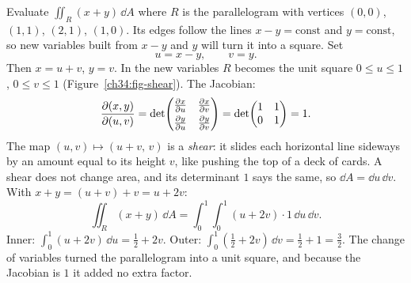 \begin{example}
\label{ch34:ex-cov}
Evaluate $\iint_R (x+y)\,\dd A$ where $R$ is the parallelogram with vertices
$(0,0)$, $(1,1)$, $(2,1)$, $(1,0)$. Its edges
follow the lines $x-y=\text{const}$ and $y=\text{const}$, so new variables built
from $x-y$ and $y$ will turn it into a square. Set
\[
  u=x-y,\qquad v=y .
\]
Then $x=u+v$, $y=v$. In the new variables $R$ becomes the unit square
$0\le u\le 1$, $0\le v\le 1$ (Figure~\ref{ch34:fig-shear}). The Jacobian:
\[
  \frac{\partial(x,y)}{\partial(u,v)}
  =\det\!\begin{pmatrix}\frac{\partial x}{\partial u}&\frac{\partial x}{\partial v}\\[3pt]\frac{\partial y}{\partial u}&\frac{\partial y}{\partial v}\end{pmatrix}
  =\det\!\begin{pmatrix}1&1\\0&1\end{pmatrix}=1 .
\]
The map $(u,v)\mapsto(u+v,\,v)$ is a \emph{shear}: it slides each horizontal
line sideways by an amount equal to its height $v$, like pushing the top of a deck
of cards. A shear does not change area, and its determinant $1$ says the same, so
$\dd A=\dd u\,\dd v$. With $x+y=(u+v)+v=u+2v$:
\[
  \iint_R(x+y)\,\dd A=\int_0^1\!\int_0^1 (u+2v)\cdot 1\,\dd u\,\dd v .
\]
Inner: $\int_0^1(u+2v)\,\dd u=\tfrac12+2v$. Outer:
$\int_0^1(\tfrac12+2v)\,\dd v=\tfrac12+1=\tfrac32$. The change of variables turned
the parallelogram into a unit square, and because the Jacobian is $1$ it added no
extra factor.
\end{example}


